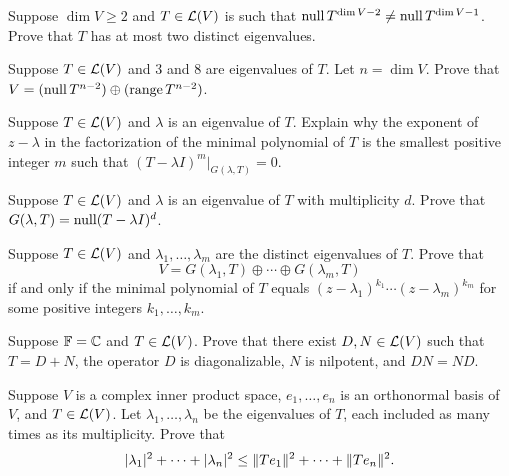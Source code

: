 \begin{exercise}
Suppose $\dim V\ge2$ and $T\in\mathcal{L}(V)$ is such that
$\operatorname{null} T^{\operatorname{dim} V-2}\ne\operatorname{null} T^{\operatorname{dim} V-1}$. Prove that $T$ has at most two
distinct eigenvalues.
\end{exercise}

\begin{exercise}
Suppose $T\in\mathcal{L}(V)$ and $3$ and $8$ are eigenvalues of $T$. Let $n=\dim V$.
Prove that $V=(\operatorname{null} T^{n-2})\oplus(\operatorname{range} T^{n-2})$.
\end{exercise}

\begin{exercise}
Suppose $T\in\mathcal{L}(V)$ and $\lambda$ is an eigenvalue of $T$. Explain why the
exponent of $z-\lambda$ in the factorization of the minimal polynomial of $T$
is the smallest positive integer $m$ such that
$(T-\lambda I)^m|_{G(\lambda,T)}=0$.
\end{exercise}

\begin{exercise}
Suppose $T\in\mathcal{L}(V)$ and $\lambda$ is an eigenvalue of $T$ with multiplicity
$d$. Prove that $G(\lambda,T)=\operatorname{null}(T-\lambda I)^d$.
\end{exercise}

\begin{exercise}
Suppose $T\in\mathcal{L}(V)$ and $\lambda_1,\dots,\lambda_m$ are the distinct
eigenvalues of $T$. Prove that
\[ V = G(\lambda_1,T)\oplus\cdots\oplus G(\lambda_m,T) \]
if and only if the minimal polynomial of $T$ equals
$(z-\lambda_1)^{k_1}\cdots(z-\lambda_m)^{k_m}$ for some positive integers
$k_1,\dots,k_m$.
\end{exercise}

\begin{exercise}
Suppose $\mathbb{F}=\mathbb{C}$ and $T\in\mathcal{L}(V)$. Prove that there exist $D,N\in\mathcal{L}(V)$ such
that $T=D+N$, the operator $D$ is diagonalizable, $N$ is nilpotent, and
$DN=ND$.
\end{exercise}

\begin{exercise}
Suppose $V$ is a complex inner product space, $e_1,\dots,e_n$ is an orthonormal
basis of $V$, and $T\in\mathcal{L}(V)$. Let $\lambda_1,\dots,\lambda_n$ be the
eigenvalues of $T$, each included as many times as its multiplicity. Prove that
\[ \lvert \lambda_1 \rvert^2+\cdots+\lvert \lambda_n \rvert^2
   \le \lVert Te_1 \rVert^2+\cdots+\lVert Te_n \rVert^2. \]
\end{exercise}

